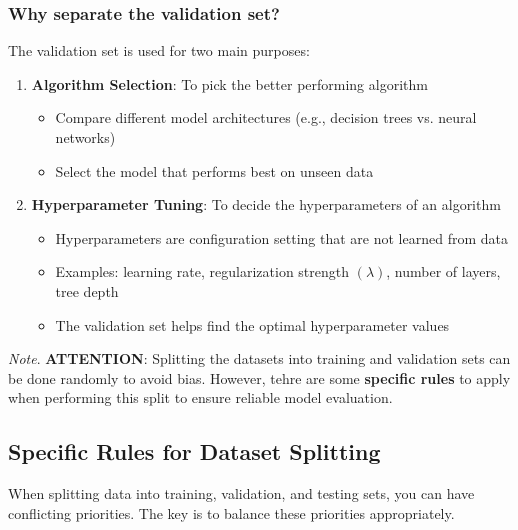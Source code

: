 \documentclass[a4paper]{article}
\theoremstyle{definition}
\begin{document}
\subsubsection{Why separate the validation set?}
The validation set is used for two main purposes:
\begin{enumerate}
    \item \textbf{Algorithm Selection}: To pick the better performing algorithm 
    \begin{itemize}
        \item Compare different model architectures (e.g., decision trees vs. neural networks)
        \item Select the model that performs best on unseen data
    \end{itemize}
    \item \textbf{Hyperparameter Tuning}: To decide the hyperparameters of an algorithm 
    \begin{itemize}
        \item Hyperparameters are configuration setting that are not learned from data
        \item Examples: learning rate, regularization strength \( (\lambda) \), number of layers, tree depth 
        \item The validation set helps find the optimal hyperparameter values
    \end{itemize}
\end{enumerate}
\textit{Note}. \textbf{ATTENTION}: Splitting the datasets into training and validation sets can be done 
randomly to avoid bias. However, tehre are some \textbf{specific rules} to apply when performing this 
split to ensure reliable model evaluation.
\subsection{Specific Rules for Dataset Splitting}
When splitting data into training, validation, and testing sets, you can have conflicting priorities.
The key is to balance these priorities appropriately.
\end{document}
